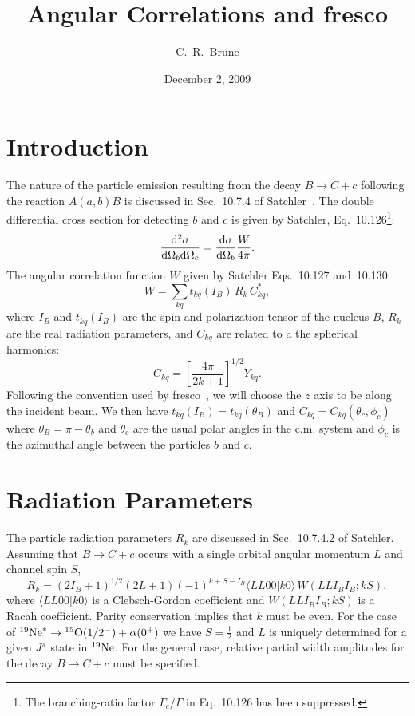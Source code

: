 \documentclass[aps,prc,amsfonts,nofootinbib]{revtex4}
\begin{document}
\title{ Angular Correlations and {\sc fresco}}
\author{ C.~R.~Brune }
\date{December 2, 2009}
\maketitle

\section{Introduction}

The nature of the particle emission resulting from the decay
$B\rightarrow C+c$ following the reaction $A(a,b)B$ is discussed
in Sec.~10.7.4 of Satchler~\cite{Sat83}.
The double differential cross section for detecting $b$ and $c$
is given by Satchler,
Eq.~10.126\footnote{The branching-ratio factor $\Gamma_c/\Gamma$
in Eq.~10.126 has been suppressed.}:
\begin{equation}
\frac{{\rm d}^2 \sigma}{{\rm d}\Omega_b{\rm d}\Omega_c} =
\frac{{\rm d}\sigma}{{\rm d}\Omega_b} \frac{W}{4\pi} .
\end{equation}
The angular correlation function $W$ given by Satchler Eqs.~10.127 and~10.130
\begin{equation}
W=\sum_{kq} t_{kq}(I_B) \, R_k \, C_{kq}^* ,
\end{equation}
where $I_B$ and $t_{kq}(I_B)$ are the spin and polarization tensor of
the nucleus $B$, $R_k$ are the real radiation parameters,
and $C_{kq}$ are related to a the spherical harmonics:
\begin{equation}
C_{kq}=\left [ \frac{4\pi}{2k+1} \right]^{1/2} Y_{kq}.
\end{equation}
Following the convention used by {\sc fresco}~\cite{Tho88}, we will
choose the $z$ axis to be along the incident beam.
We then have  $t_{kq}(I_B)=t_{kq}(\theta_B)$ and
$C_{kq}=C_{kq}(\theta_c,\phi_c)$ where $\theta_B=\pi-\theta_b$ and
$\theta_c$ are the usual polar angles in the c.m. system and $\phi_c$ is
the azimuthal angle between the particles $b$ and $c$.

\section{Radiation Parameters}

The particle radiation parameters $R_k$ are discussed in Sec.~10.7.4.2
of Satchler.
Assuming that $B\rightarrow C+c$ occurs with a single orbital
angular momentum $L$ and channel spin $S$,
\begin{equation}
R_k=(2I_B+1)^{1/2}(2L+1)(-1)^{k+S-I_B}\langle LL00|k0\rangle \,
W(LLI_BI_B;kS),
\end{equation}
where $\langle LL00|k0\rangle$ is a Clebsch-Gordon coefficient
and $W(LLI_BI_B;kS)$ is a Racah coefficient.
Parity conservation implies that $k$ must be even.
For the case of ${}^{19}{\rm Ne}^*\rightarrow
{}^{15}{\rm O}(1/2^-)+\alpha(0^+)$
we have $S=\frac{1}{2}$ and $L$ is uniquely determined for
a given $J^\pi$ state in ${}^{19}{\rm Ne}$.
For the general case, relative partial width amplitudes for the decay
$B\rightarrow C+c$ must be specified.
\end{document}
